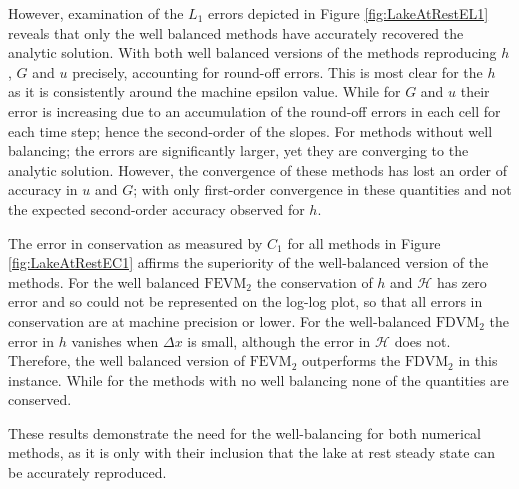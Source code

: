 However, examination of the $L_1$ errors depicted in Figure \ref{fig:LakeAtRestEL1} reveals that only  the well balanced methods have accurately recovered the analytic solution. With both well balanced versions of the methods reproducing $h$, $G$ and $u$ precisely, accounting for round-off errors. This is most clear for the $h$ as it is consistently around the machine epsilon value. While for $G$ and $u$ their error is increasing due to an accumulation of the round-off errors in each cell for each time step; hence the second-order of the slopes. For methods without well balancing; the errors are significantly larger, yet they are converging to the analytic solution. However, the convergence of these methods has lost an order of accuracy in $u$ and $G$; with only first-order convergence in these quantities and not the expected second-order accuracy observed for $h$. 

The error in conservation as measured by $C_1$ for all methods in Figure \ref{fig:LakeAtRestEC1} affirms the superiority of the well-balanced version of the methods. For the well balanced $\text{FEVM}_2$ the conservation of $h$ and $\mathcal{H}$ has zero error and so could not be represented on the log-log plot, so that all errors in conservation are at machine precision or lower. For the well-balanced $\text{FDVM}_2$ the error in $h$ vanishes when $\Delta x$ is small, although the error in $\mathcal{H}$ does not. Therefore, the well balanced version of $\text{FEVM}_2$ outperforms the $\text{FDVM}_2$ in this instance. While for the methods with no well balancing none of the quantities are conserved.   

These results demonstrate the need for the well-balancing for both numerical methods, as it is only with their inclusion that the lake at rest steady state can be accurately reproduced. 



